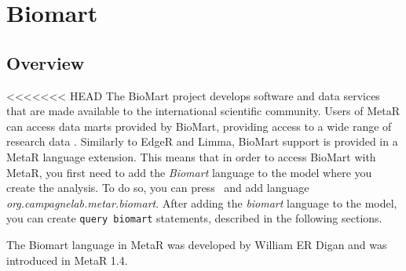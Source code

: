 

\chapter{Biomart}\label{chap:Biomart}

\section{Overview}
<<<<<<< HEAD
The BioMart project develops software and data services that are made available to the international scientific community. Users of MetaR can access data marts provided by BioMart, providing access to a wide range of research data . Similarly to EdgeR and Limma, BioMart support is provided in a MetaR language extension. This means that in order to access BioMart with MetaR, you first need to add the \textit{Biomart} language to the model where you create the analysis. To do so, you can press~ and add language \textit{org\allowbreak.campagnelab\allowbreak.metar\allowbreak.biomart}. After adding the \textit{biomart} language to the model, you can create \texttt{query biomart} statements, described in the following sections. 
\begin{remark}
The Biomart language in MetaR was developed by William ER Digan and was introduced in MetaR 1.4.
\end{remark}

